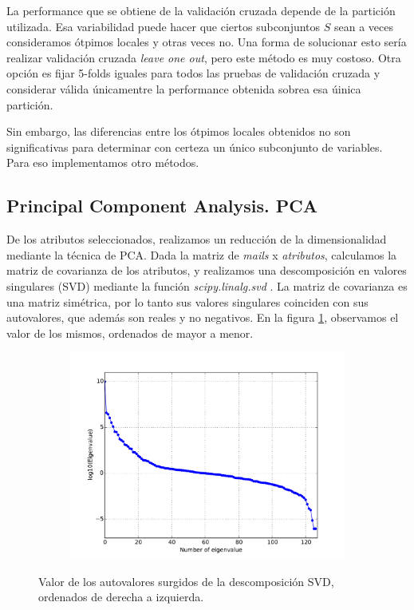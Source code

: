 \documentclass[a4paper,10pt]{article}
\begin{document}
La performance que se obtiene de la validaci\'on cruzada depende de la partici\'on utilizada. Esa variabilidad puede hacer que ciertos subconjuntos $S$ sean a veces consideramos \'otpimos locales y otras veces no. Una forma de solucionar esto ser\'ia realizar validaci\'on cruzada \emph{leave one out}, pero este m\'etodo es muy costoso. Otra opci\'on es fijar 5-folds iguales para todos las pruebas de validaci\'on cruzada y considerar v\'alida \'unicamentre la performance obtenida sobrea esa \'uinica partici\'on.  

Sin embargo, las diferencias entre los \'otpimos locales obtenidos no son significativas para determinar con certeza un \'unico subconjunto de variables. Para eso implementamos otro m\'etodos. 

\subsection{Principal Component Analysis. PCA}

\par De los atributos seleccionados, realizamos un reducción de la dimensionalidad
mediante la técnica de PCA. Dada la matriz de \emph{mails} x \emph{atributos},
calculamos la matriz de covarianza de los atributos, y realizamos una descomposición en valores singulares (SVD) mediante la funci\'on \emph{scipy.linalg.svd} \cite{scipy}. La matriz de covarianza es una matriz simétrica, por lo tanto sus valores singulares coinciden con sus autovalores, que además son reales y no negativos. En la figura \ref{fig:autovalores}, observamos el valor de los mismos, ordenados de mayor a menor. 
  \begin{figure}[H]
    \centering
    \begin{subfigure}[b]{0.4\textwidth}
      \includegraphics[width=\textwidth]{../imagenes/Autovalores}
    \end{subfigure}
    \caption{Valor de los autovalores surgidos de la descomposición SVD, ordenados de derecha a izquierda.}
    \label{fig:autovalores}
  \end{figure}
\end{document}
